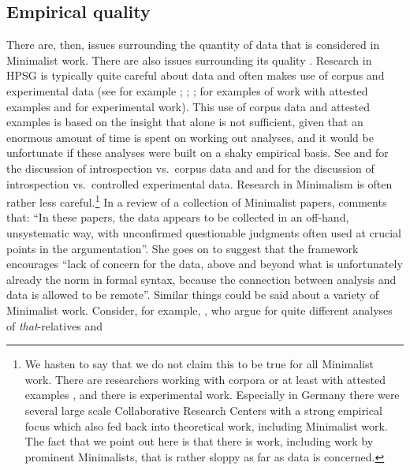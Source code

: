 \documentclass[output=paper
	        ,collection
	        ,collectionchapter
 	        ,biblatex
                ,babelshorthands
                ,newtxmath
                ,draftmode
                ,colorlinks, citecolor=brown
]{langscibook}
\begin{document}
\subsection{Empirical quality}
\label{sec-empirical-quality}

There are, then, issues surrounding the quantity of data that is considered in Minimalist work. There are
also issues surrounding its quality \citep{Schuetze2016a}. Research in HPSG is typically quite careful about data and often
makes use of corpus and experimental data (see for example
\citealt*{AA2017a-u,Mueller99a,Mueller2002b,BC2010a,MBC2012a,Chaves2013a-u,Miller2013a}; \citealt[Chapter~7]{VanEynde2015a-u};
\citealt{ACS2016a-u}; \citealt{SAHM2019a-u}
for examples of work with attested examples and for experimental work).
This use of corpus data and attested examples is based on the insight that  alone is not sufficient, given that an
enormous amount of time is spent on working out analyses, and it would be unfortunate if these analyses
were built on a shaky empirical basis. See  and  for the
discussion of introspection vs.\ corpus data and  and  for the discussion of introspection
vs.\ controlled experimental data.
Research in Minimalism is often rather less
careful.\footnote{
 We hasten to say that we do not claim this to be true for all Minimalist work. There are
 researchers working with corpora or at least with attested examples \citep{Wurmbrand2003a}, and
 there is experimental work. Especially in Germany there were several large scale Collaborative
 Research Centers with a strong empirical focus which also fed back into theoretical work, including
 Minimalist work. The fact that we point out here is that there is work, including work
 by prominent Minimalists, that is rather sloppy as far as data is concerned.%
} In a review of a collection of Minimalist papers, \citet[]{Bender2002b-u} comments that: ``In
these papers, the data appears to be collected in an off-hand, unsystematic way, with unconfirmed
questionable judgments often used at crucial points in the argumentation''. She goes on to suggest
that the framework encourages ``lack of concern for the data, above and beyond what is unfortunately
already the norm in formal syntax, because the connection between analysis and data is allowed to be
remote''. Similar things could be said about a variety of Minimalist work. Consider, for example,
\citet{AounLi.2003}, who argue for quite different analyses of \emph{that}-relatives and
\end{document}
